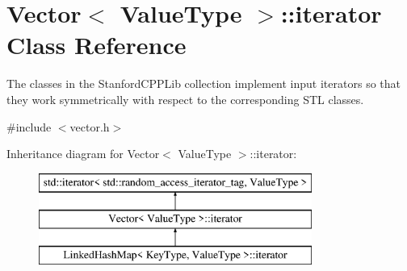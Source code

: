 \hypertarget{classVector_1_1iterator}{}\section{Vector$<$ Value\+Type $>$\+:\+:iterator Class Reference}
\label{classVector_1_1iterator}


The classes in the Stanford\+C\+P\+P\+Lib collection implement input iterators so that they work symmetrically with respect to the corresponding S\+TL classes.  




{\ttfamily \#include $<$vector.\+h$>$}

Inheritance diagram for Vector$<$ Value\+Type $>$\+:\+:iterator\+:\begin{figure}[H]
\begin{center}
\leavevmode
\includegraphics[height=3.000000cm]{classVector_1_1iterator}
\end{center}
\end{figure}
